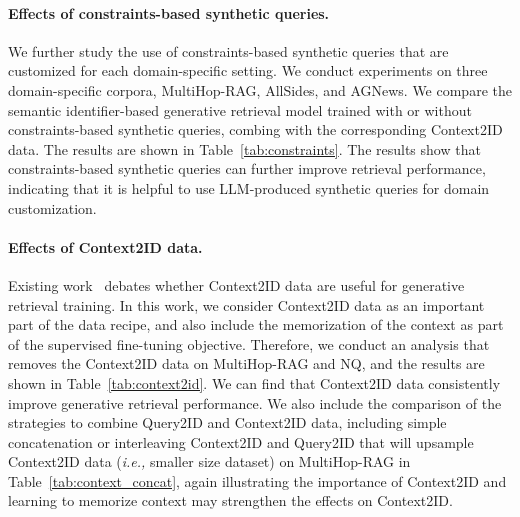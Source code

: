 \paragraph{Effects of constraints-based synthetic queries.} We further study the use of constraints-based synthetic queries that are customized for each domain-specific setting. We conduct experiments on three domain-specific corpora, MultiHop-RAG, AllSides, and AGNews. We compare the semantic identifier-based generative retrieval model trained with or without constraints-based synthetic queries, combing with the corresponding Context2ID data. The results are shown in Table~\ref{tab:constraints}. The results show that constraints-based synthetic queries can further improve retrieval performance, indicating that it is helpful to use LLM-produced synthetic queries for domain customization.


\begin{table}[t]
    \centering
    \small
    \caption{Analysis on different ways of combining Query2ID and Context2ID data on Multihop-RAG. We compare simple concatenation (Concat) and interleaving (Interleave) that inherently upsamples the Context2ID data.} %
    \label{tab:context_concat}
    \vspace{-0.5em}
\end{table}

\paragraph{Effects of Context2ID data.} Existing work~\citep{DBLP:journals/corr/abs-2206-10128,DBLP:conf/icml/KishoreWLAW23} debates whether Context2ID data are useful for generative retrieval training. In this work, we consider Context2ID data as an important part of the data recipe, and also include the memorization of the context as part of the supervised fine-tuning objective. Therefore, we conduct an analysis that removes the Context2ID data on MultiHop-RAG and NQ, and the results are shown in Table~\ref{tab:context2id}. We can find that Context2ID data consistently improve generative retrieval performance. We also include the comparison of the strategies to combine Query2ID and Context2ID data, including simple concatenation or interleaving Context2ID and Query2ID that will upsample Context2ID data (\textit{i.e.,} smaller size dataset) on MultiHop-RAG in Table~\ref{tab:context_concat}, again illustrating the importance of Context2ID and learning to memorize context may strengthen the effects on Context2ID.

